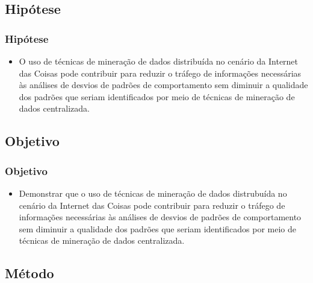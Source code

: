\documentclass[hyperref={pdfpagelabels=false}]{beamer}
\begin{document}
\subsection{Hipótese}
 
\begin{frame}
	\frametitle{Hipótese}
	
    \begin{itemize}
    	\item O uso de t\'{e}cnicas de minera\c{c}\~{a}o de dados distribu\'{i}da no cenário da Internet das Coisas pode contribuir para reduzir o tráfego de informações necessárias às análises de desvios de padrões de comportamento sem diminuir a qualidade dos padrões que seriam identificados por meio de técnicas de mineração de dados centralizada.
    \end{itemize}
\end{frame}

\subsection{Objetivo}
 
\begin{frame}
	\frametitle{Objetivo}

	\begin{itemize}
		\item Demonstrar que o uso de t\'{e}cnicas de minera\c{c}\~{a}o de dados distrubu\'{i}da no cenário da Internet das Coisas pode contribuir para reduzir o tráfego de informações necessárias às análises de desvios de padrões de comportamento sem diminuir a qualidade dos padrões que seriam identificados por meio de técnicas de mineração de dados centralizada.
	\end{itemize}

\end{frame}

\subsection{Método}  
\end{document}
